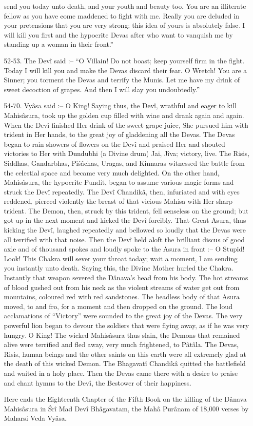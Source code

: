 send you today unto death, and your youth and beauty too. You are an illiterate fellow as you have come maddened to fight with me. Really you are deluded in your pretensions that you are very strong; this idea of yours is absolutely false. I will kill you first and the hypocrite Devas after who want to vanquish me by standing up a woman in their front.''

52-53. The Dev\^i said :-- ``O Villain! Do not boast; keep yourself firm in the fight. Today I will kill you and make the Devas discard their fear. O Wretch! You are a Sinner; you torment the Devas and terrify the Munis. Let me have my drink of sweet decoction of grapes. And then I will slay you undoubtedly.''

54-70. Vy\^asa said :-- O King! Saying thus, the Dev\^i, wrathful and eager to kill Mahis\^asura, took up the golden cup filled with wine and drank again and again. When the Dev\^i finished Her drink of the sweet grape juice, She pursued him with trident in Her hands, to the great joy of gladdening all the Devas. The Devas began to rain showers of flowers on the Dev\^i and praised Her and shouted victories to Her with Dundubhi (a Divine drum) Jai, J\^iva; victory, live. The Risis, Siddhas, Gandarbhas, Pi\'s\^achas, Uragas, and Kinnaras witnessed the battle from the celestial space and became very much delighted. On the other hand, Mahis\^asura, the hypocrite Pundit, began to assume various magic forms and struck the Dev\^i repeatedly. The Dev\^i Chandik\^a, then, infuriated and with eyes reddened, pierced violently the breast of that vicious Mahisa with Her sharp trident. The Demon, then, struck by this trident, fell senseless on the ground; but got up in the next moment and kicked the Dev\^i forcibly. That Great Asura, thus kicking the Dev\^i, laughed repeatedly and bellowed so loudly that the Devas were all terrified with that noise. Then the Dev\^i held aloft the brilliant discus of good axle and of thousand spokes and loudly spoke to the Asura in front :-- O Stupid! Look! This Chakra will sever your throat today; wait a moment, I am sending you instantly unto death. Saying this, the Divine Mother hurled the Chakra. Instantly that weapon severed the D\^anava's head from his body. The hot streams of blood gushed out from his neck as the violent streams of water get out from mountains, coloured red with red sandstones. The headless body of that Asura moved, to and fro, for a moment and then dropped on the ground. The loud acclamations of ``Victory'' were sounded to the great joy of the Devas. The very powerful lion began to devour the soldiers that were flying away, as if he was very hungry. O King! The wicked Mahis\^asura thus slain, the Demons that remained alive were terrified and fled away, very much frightened, to P\^at\^ala. The Devas, Risis, human beings and the other saints on this earth were all extremely glad at the death of this wicked Demon. The Bhagavat\^i Chandik\^a quitted the battlefield and waited in a holy place. Then the Devas came there with a desire to praise and chant hymns to the Dev\^i, the Bestower of their happiness.

Here ends the Eighteenth Chapter of the Fifth Book on the killing of the D\^anava Mahis\^asura in \'Sr\^i Mad Dev\^i Bh\^agavatam, the Mah\^a Pur\^anam of 18,000 verses by Maharsi Veda Vy\^asa.